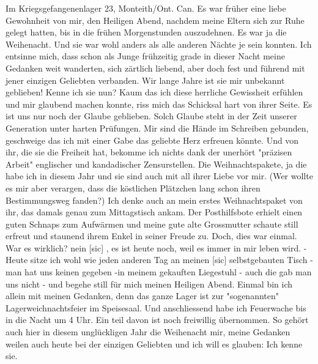 \def\day{Am Heiligen Abend 1942 {\color{red} [24.12.1942] }}
\mktitle

Im Kriegsgefangenenlager 23, Monteith/Ont. Can.
Es war fr\"{u}her eine liebe Gewohnheit von mir, den Heiligen Abend, nachdem meine Eltern sich zur Ruhe gelegt hatten, bis in die fr\"{u}hen Morgenstunden auszudehnen.
Es war ja die Weihenacht.
Und sie war wohl anders als alle anderen N\"{a}chte je sein konnten.
Ich entsinne mich, dass schon als Junge fr\"{u}hzeitig grade in dieser Nacht meine Gedanken weit wanderten, sich z\"{a}rtlich liebend, aber doch fest und f\"{u}hrend mit jener einzigen Geliebten verbanden.
Wir lange Jahre ist sie mir unbekannt geblieben!
Kenne ich sie nun?
Kaum das ich diese herrliche Gewissheit erf\"{u}hlen und mir glaubend machen konnte, riss mich das Schicksal hart von ihrer Seite.
Es ist uns nur noch der Glaube geblieben.
Solch Glaube steht in der Zeit unserer Generation unter harten Pr\"{u}fungen.
Mir sind die H\"{a}nde im Schreiben gebunden, geschweige das ich mit einer Gabe das geliebte Herz erfreuen k\"{o}nnte.
Und von ihr, die sie die Freiheit hat, bekomme ich nichts dank der unerh\"{o}rt "pr\"{a}zisen Arbeit" englischer und kandadischer Zensurstellen.
Die Weihnachtspakete, ja die habe ich in diesem Jahr und sie sind auch mit all ihrer Liebe vor mir.
(Wer wollte es mir aber verargen, dass die k\"{o}stlichen Pl\"{a}tzchen lang schon ihren Bestimmungsweg fanden?)
Ich denke auch an mein erstes Weihnachtspaket von ihr, das damals genau zum Mittagstisch ankam.
Der Posthilfsbote erhielt einen guten Schnaps zum Aufw\"{a}rmen und meine gute alte Grossmutter schaute still erfreut und staunend ihrem Enkel in seiner Freude zu.
Doch, dies war einmal.
War es wirklich?
nein{\color{red} [sic] }, es ist heute noch, weil es immer in mir leben wird.
- Heute sitze ich wohl wie jeden anderen Tag an meinen{\color{red} [sic] } selbstgebauten Tisch - man hat uns keinen gegeben -in meinem gekauften Liegestuhl - auch die gab man uns nicht - und begehe still f\"{u}r mich meinen Heiligen Abend.
Einmal bin ich allein mit meinen Gedanken, denn das ganze Lager ist zur "sogenannten" Lagerweichnachtsfeier im Speisesaal.
Und anschliessend habe ich Feuerwache bis in die Nacht um 4 Uhr.
Ein teil davon ist noch freiwillig \"{u}bernommen.
So geh\"{o}rt auch hier in diesem ungl\"{u}ckligen Jahr die Weihenacht mir, meine Gedanken weilen auch heute bei der einzigen Geliebten und ich will es glauben: Ich kenne sie.

\clearpage

